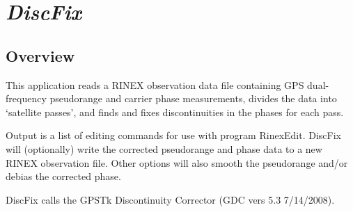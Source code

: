 %
%


\section{\emph{DiscFix}}
\subsection{Overview}
This application reads a RINEX observation data file containing GPS dual-frequency pseudorange and carrier phase measurements, divides the data into `satellite passes', and finds and fixes discontinuities in the phases for each pass.

 Output is a list of editing commands for use with program RinexEdit. DiscFix will (optionally) write the corrected pseudorange and phase data to a new RINEX observation file. Other options will also smooth the pseudorange and/or debias the corrected phase. 

DiscFix calls the GPSTk Discontinuity Corrector (GDC vers 5.3 7/14/2008).

